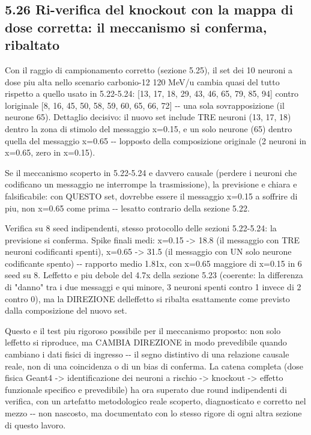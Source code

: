 \documentclass[
  italian,
]{article}
\begin{document}
\subsection{5.26 Ri-verifica del knockout con la mappa di dose corretta: il meccanismo si conferma, ribaltato}\label{ri-verifica-del-knockout-con-la-mappa-di-dose-corretta-il-meccanismo-si-conferma-ribaltato}

Con il raggio di campionamento corretto (sezione 5.25), il set dei 10 neuroni a dose piu\textquotesingle{} alta nello scenario carbonio-12 120 MeV/u cambia quasi del tutto rispetto a quello usato in 5.22-5.24: {[}13, 17, 18, 29, 43, 46, 65, 79, 85, 94{]} contro l\textquotesingle originale {[}8, 16, 45, 50, 58, 59, 60, 65, 66, 72{]} -\/- una sola sovrapposizione (il neurone 65). Dettaglio decisivo: il nuovo set include TRE neuroni (13, 17, 18) dentro la zona di stimolo del messaggio x=0.15, e un solo neurone (65) dentro quella del messaggio x=0.65 -\/- l\textquotesingle opposto della composizione originale (2 neuroni in x=0.65, zero in x=0.15).

Se il meccanismo scoperto in 5.22-5.24 e\textquotesingle{} davvero causale (perdere i neuroni che codificano un messaggio ne interrompe la trasmissione), la previsione e\textquotesingle{} chiara e falsificabile: con QUESTO set, dovrebbe essere il messaggio x=0.15 a soffrire di piu\textquotesingle, non x=0.65 come prima -\/- l\textquotesingle esatto contrario della sezione 5.22.

Verifica su 8 seed indipendenti, stesso protocollo delle sezioni 5.22-5.24: la previsione si conferma. Spike finali medi: x=0.15 -\textgreater{} 18.8 (il messaggio con TRE neuroni codificanti spenti), x=0.65 -\textgreater{} 31.5 (il messaggio con UN solo neurone codificante spento) -\/- rapporto medio 1.81x, con x=0.65 maggiore di x=0.15 in 6 seed su 8. L\textquotesingle effetto e\textquotesingle{} piu\textquotesingle{} debole del 4.7x della sezione 5.23 (coerente: la differenza di "danno" tra i due messaggi e\textquotesingle{} qui minore, 3 neuroni spenti contro 1 invece di 2 contro 0), ma la DIREZIONE dell\textquotesingle effetto si ribalta esattamente come previsto dalla composizione del nuovo set.

Questo e\textquotesingle{} il test piu\textquotesingle{} rigoroso possibile per il meccanismo proposto: non solo l\textquotesingle effetto si riproduce, ma CAMBIA DIREZIONE in modo prevedibile quando cambiano i dati fisici di ingresso -\/- il segno distintivo di una relazione causale reale, non di una coincidenza o di un bias di conferma. La catena completa (dose fisica Geant4 -\textgreater{} identificazione dei neuroni a rischio -\textgreater{} knockout -\textgreater{} effetto funzionale specifico e prevedibile) ha ora superato due round indipendenti di verifica, con un artefatto metodologico reale scoperto, diagnosticato e corretto nel mezzo -\/- non nascosto, ma documentato con lo stesso rigore di ogni altra sezione di questo lavoro.
\end{document}
